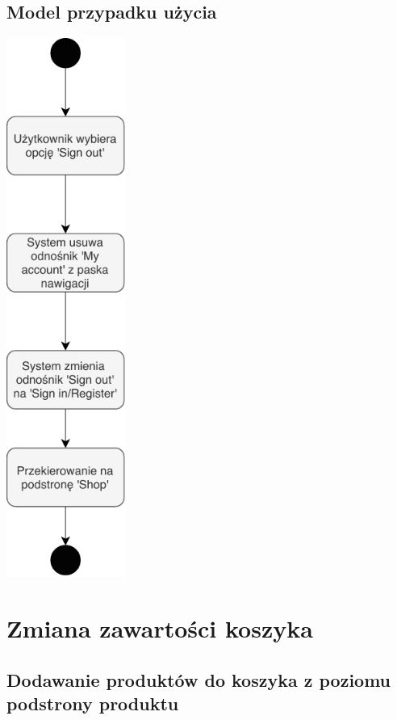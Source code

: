 \documentclass[12pt]{report}
\begin{document}
	\subsection{Model przypadku użycia}
	\begin{center}
		\includegraphics[width=110pt]{wylogowanie.pdf}
	\end{center}
	\newpage
		
	\section{Zmiana zawartości koszyka}
		\subsection{Dodawanie produktów do koszyka z poziomu podstrony produktu}
\end{document}
